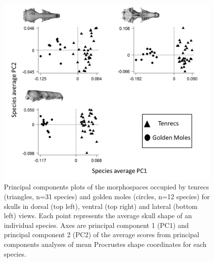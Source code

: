 \documentclass[12pt,a4paper]{article}
\begin{document}
	\begin{figure}[!htbp]
	\centering
	\includegraphics[width=1\linewidth, height=1\textheight, keepaspectratio]{figures/PCA_threeplot.png}
	\caption[Morphospace (principal components) plot of morphological diversity in tenrec and golden mole skulls.]
		{Principal components plots of the morphospaces occupied by tenrecs (triangles, n=31 species) and golden moles (circles, n=12 species) for skulls in dorsal (top left), ventral (top right) and lateral (bottom left) views. Each point represents the average skull shape of an individual species. Axes are principal component 1 (PC1) and principal component 2 (PC2) of the average scores from principal components analyses of mean Procrustes shape coordinates for each species.}
	\label{fig:threePCA}
	\end{figure}
\end{document}
